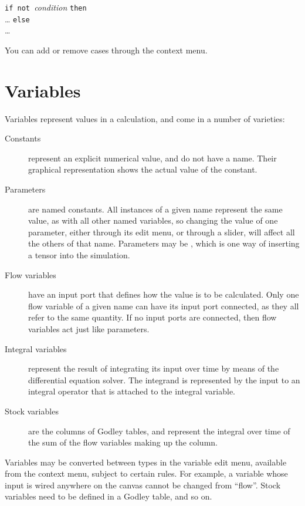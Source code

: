 \parbox{\textwidth}{
  {\tt if not }{\em condition} {\tt then}\\
  \ldots
  {\tt else}\\
  \ldots }

You can add or remove cases through the context menu.

\section{Variables}\label{Variables}\label{Variable:constant}\label{VarConstant}\label{Variable:parameter}
\label{Variable:flow}\label{Variable:integral}\label{Variable:stock}

Variables represent values in a calculation, and come in a number of
varieties:
\begin{description}
\item[Constants] represent an explicit numerical value, and do not
  have a name. Their graphical representation shows the actual value
  of the constant.
\item[Parameters] are named constants. All instances of a given name
  represent the same value, as with all other named variables, so
  changing the value of one parameter, either through its edit menu,
  or through a slider, will affect all the others of that
  name. Parameters may be , which is one way of inserting a tensor into the
  simulation.
\item[Flow variables] have an input port that defines how the value is
  to be calculated. Only one flow variable of a given name can have
  its input port connected, as they all refer to the same quantity. If
  no input ports are connected, then flow variables act just like
  parameters.
\item[Integral variables] represent the result of integrating its
  input over time by means of the differential equation solver. The
  integrand is represented by the input to an integral operator that
  is attached to the integral variable.
\item[Stock variables] are the columns of Godley tables, and represent
  the integral over time of the sum of the flow variables making up
  the column.
\end{description}

Variables may be converted between types in the variable edit menu,
available from the context menu, subject to certain rules. For
example, a variable whose input is wired anywhere on the canvas cannot
be changed from ``flow''. Stock variables need to be defined in a
Godley table, and so on.

